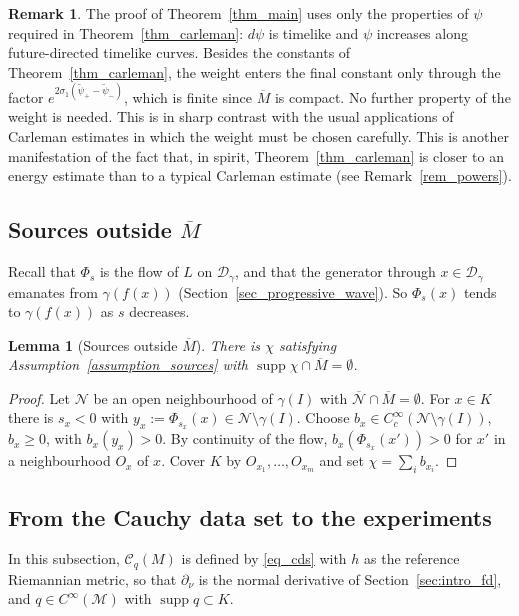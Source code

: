 \documentclass[12pt,reqno]{amsart}
\numberwithin{equation}{section}
\theoremstyle{definition}
\theoremstyle{plain}
\newtheorem{lemma}[theorem]{Lemma}
\theoremstyle{definition}
\theoremstyle{definition}
\newtheorem{remark}[theorem]{Remark}
\newcommand{\M}{\mathcal{M}}
\newcommand{\D}{\mathcal{D}}
\newcommand{\dg}{\D_\gamma}
\newcommand{\uu}{M}
\DeclareMathOperator{\supp}{supp}
\begin{document}
\begin{remark}\label{rem_weight}
The proof of Theorem~\ref{thm_main} uses only the properties of $\psi$ required in Theorem~\ref{thm_carleman}: $d\psi$ is timelike and $\psi$ increases along future-directed timelike curves. Besides the constants of Theorem~\ref{thm_carleman}, the weight enters the final constant only through the factor $e^{2\sigma_1(\tilde\psi_+-\tilde\psi_-)}$, which is finite since $\overline\uu$ is compact. No further property of the weight is needed. This is in sharp contrast with the usual applications of Carleman estimates in which the weight must be chosen carefully. This is another manifestation of the fact that, in spirit, Theorem~\ref{thm_carleman} is closer to an energy estimate than to a typical Carleman estimate (see Remark~\ref{rem_powers}).
\end{remark}


\subsection{Sources outside \texorpdfstring{$\overline\uu$}{M}}

Recall that $\Phi_s$ is the flow of $L$ on $\dg$, and that the generator through $x\in\dg$ emanates from $\gamma(f(x))$ (Section~\ref{sec_progressive_wave}). So $\Phi_s(x)$ tends to $\gamma(f(x))$ as $s$ decreases.

\begin{lemma}[Sources outside $\overline\uu$]\label{lem_exterior_source}
There is $\chi$ satisfying Assumption~\ref{assumption_sources} with $\supp\chi\cap\overline\uu=\emptyset$.
\end{lemma}
\begin{proof}
Let $\mathcal N$ be an open neighbourhood of $\gamma(I)$ with $\overline{\mathcal N}\cap\overline\uu=\emptyset$. For $x\in K$ there is $s_x<0$ with $y_x:=\Phi_{s_x}(x)\in\mathcal N\setminus\gamma(I)$. Choose $b_x\in C^\infty_c(\mathcal N\setminus\gamma(I))$, $b_x\ge0$, with $b_x(y_x)>0$. By continuity of the flow, $b_x(\Phi_{s_x}(x'))>0$ for $x'$ in a neighbourhood $O_x$ of $x$. Cover $K$ by $O_{x_1},\dots,O_{x_m}$ and set $\chi=\sum_ib_{x_i}$.
\end{proof}

\subsection{From the Cauchy data set to the experiments}

In this subsection, $\mathcal C_q(\uu)$ is defined by \eqref{eq_cds} with $h$ as the reference Riemannian metric, so that $\partial_\nu$ is the normal derivative of Section~\ref{sec:intro_fd}, and $q\in C^\infty(\M)$ with $\supp q\subset K$.
\end{document}
